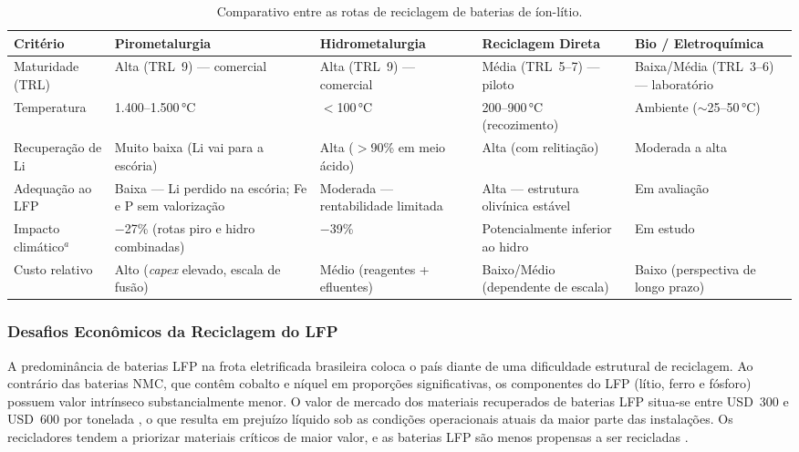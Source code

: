 \begin{table}[H]
\centering
\caption{Comparativo entre as rotas de reciclagem de baterias de íon-lítio.}
\label{tab:rotas-reciclagem}
\small
\renewcommand{\arraystretch}{1.2}
\begin{tabularx}{\textwidth}{@{} p{3cm} X X X X @{}}
\toprule
\textbf{Critério} & \textbf{Pirometalurgia} & \textbf{Hidrometalurgia} &
\textbf{Reciclagem Direta} & \textbf{Bio / Eletroquímica} \\
\midrule
Maturidade (TRL) & Alta (TRL~9) — comercial & Alta (TRL~9) — comercial &
Média (TRL~5--7) — piloto & Baixa/Média (TRL~3--6) — laboratório \\
\addlinespace
Temperatura & 1.400--1.500\,°C & $<$100\,°C & 200--900\,°C (recozimento) &
Ambiente ($\sim$25--50\,°C) \\
\addlinespace
Recuperação de Li & Muito baixa (Li vai para a escória) &
Alta ($>$90\% em meio ácido) & Alta (com relitiação) & Moderada a alta \\
\addlinespace
Adequação ao LFP & Baixa — Li perdido na escória; Fe e P sem valorização &
Moderada — rentabilidade limitada & Alta — estrutura olivínica estável &
Em avaliação \\
\addlinespace
Impacto climático$^{a}$ & $-$27\% (rotas piro e hidro combinadas) &
$-$39\% & Potencialmente inferior ao hidro & Em estudo \\
\addlinespace
Custo relativo & Alto (\textit{capex} elevado, escala de fusão) &
Médio (reagentes + efluentes) & Baixo/Médio (dependente de escala) &
Baixo (perspectiva de longo prazo) \\
\bottomrule
\end{tabularx}
\par{}
\end{table}

\subsubsection{Desafios Econômicos da Reciclagem do LFP}
\label{subsec:lfp-economics}

A predominância de baterias LFP na frota eletrificada brasileira coloca o país
diante de uma dificuldade estrutural de reciclagem. Ao contrário das baterias NMC,
que contêm cobalto e níquel em proporções significativas, os componentes do LFP
(lítio, ferro e fósforo) possuem valor intrínseco substancialmente menor. O valor
de mercado dos materiais recuperados de baterias LFP situa-se entre USD~300 e
USD~600 por tonelada , o que resulta em prejuízo líquido sob as condições
operacionais atuais da maior parte das instalações. Os recicladores tendem a
priorizar materiais críticos de maior valor, e as baterias LFP são menos propensas
a ser recicladas \cite{nrel2023}.

